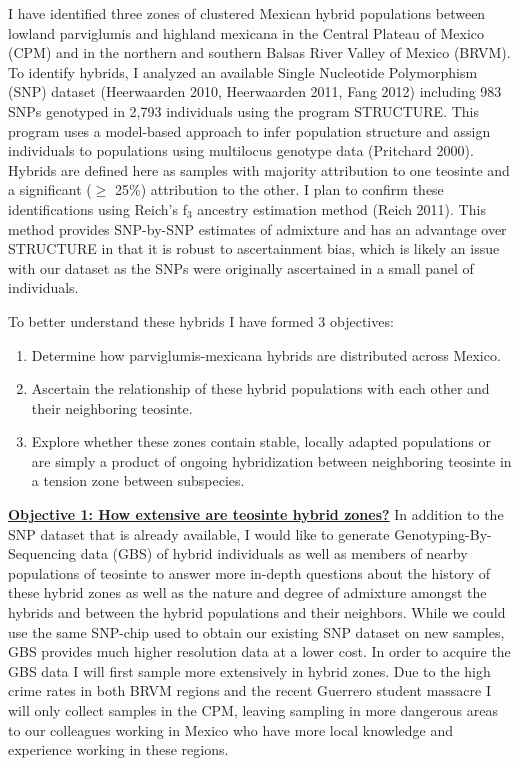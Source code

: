 \documentclass[12pt]{amsart}
\begin{document}
I have identified three zones of clustered Mexican hybrid populations between lowland parviglumis and highland mexicana in the Central Plateau of Mexico (CPM) and in the northern and southern Balsas River Valley of Mexico (BRVM). 
To identify hybrids, I analyzed an available Single Nucleotide Polymorphism (SNP) dataset  (Heerwaarden 2010, Heerwaarden 2011, Fang 2012) including 983 SNPs genotyped in 2,793 individuals using the program STRUCTURE.
This program uses a model-based approach to infer population structure and assign individuals to populations using multilocus genotype data (Pritchard 2000).
Hybrids are defined here as samples with majority attribution to one teosinte and a significant ($\geq$ 25\%) attribution to the other.
I plan to confirm these identifications using Reich's f$_{\text{3}}$ ancestry estimation method (Reich  2011).  
This method provides SNP-by-SNP estimates of admixture and has an advantage over STRUCTURE in that it is robust to ascertainment bias, which is likely an issue with our dataset as the SNPs were originally ascertained in a small panel of individuals.

To better understand these hybrids I have formed 3 objectives: 
\begin{enumerate} 
	\item Determine how parviglumis-mexicana hybrids are distributed across Mexico.
	\item Ascertain the relationship of these hybrid populations with each other and their neighboring teosinte.
	\item Explore whether these zones contain stable, locally adapted populations or are simply a product of ongoing hybridization between neighboring teosinte in a tension zone between subspecies.
\end{enumerate} 

\hfill\break \textbf{\underline{Objective 1: How extensive are teosinte hybrid zones?} } 
In addition to the SNP dataset that is already available, I would like to generate Genotyping-By-Sequencing data (GBS) of hybrid individuals as well as members of nearby populations of teosinte to answer more in-depth questions about the history of these hybrid zones as well as the nature and degree of admixture amongst the hybrids and between the hybrid populations and their neighbors.  
While we could use the same SNP-chip used to obtain our existing SNP dataset on new samples, GBS provides much higher resolution data at a lower cost.
In order to acquire the GBS data I will first sample more extensively in hybrid zones.  
Due to the high crime rates in both BRVM regions and the recent Guerrero student massacre I will only collect samples in the CPM, leaving sampling in more dangerous areas to our colleagues working in Mexico who have more local knowledge and experience working in these regions.
\end{document}
